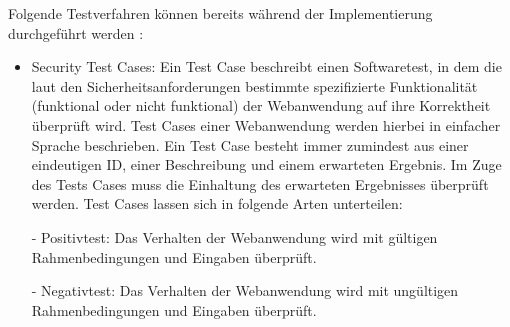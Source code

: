 \documentclass[12pt,oneside,a4paper,parskip]{scrbook}
\begin{document}
  Folgende Testverfahren können bereits während der Implementierung durchgeführt werden \cite{BSI}:
  \begin{itemize}
    \item Security Test Cases:
    Ein Test Case beschreibt einen Softwaretest, in dem die laut den Sicherheitsanforderungen
    bestimmte spezifizierte Funktionalität (funktional oder nicht funktional) der Webanwendung auf
    ihre Korrektheit überprüft wird. Test Cases einer Webanwendung werden hierbei in einfacher
    Sprache beschrieben.
    Ein Test Case besteht immer zumindest aus einer eindeutigen ID, einer Beschreibung und einem
    erwarteten Ergebnis.
    Im Zuge des Tests Cases muss die Einhaltung des erwarteten Ergebnisses überprüft werden.
    Test Cases lassen sich in folgende Arten unterteilen:

    - Positivtest: Das Verhalten der Webanwendung wird mit gültigen Rahmenbedingungen und
    Eingaben überprüft.

    - Negativtest: Das Verhalten der Webanwendung wird mit ungültigen Rahmenbedingungen
    und Eingaben überprüft.


\end{itemize}
\end{document}
